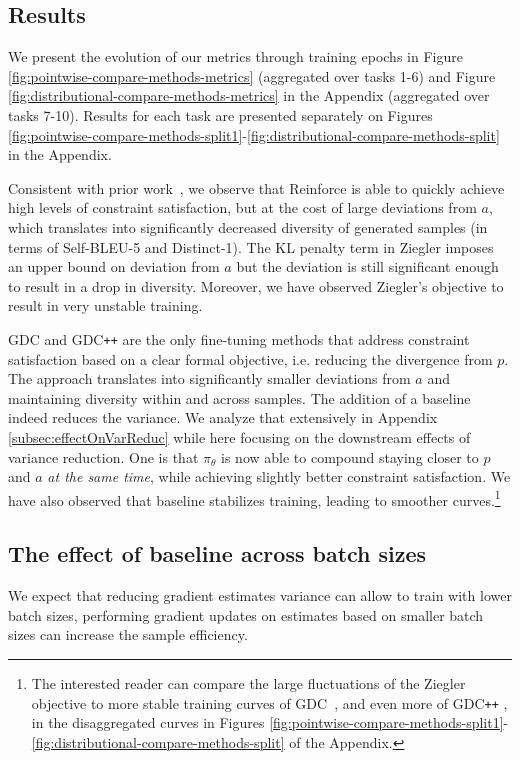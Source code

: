 \subsection{Results}
\label{subsec:general_results}
We present the evolution of our metrics through training epochs in Figure \ref{fig:pointwise-compare-methods-metrics} (aggregated over tasks 1-6) and Figure \ref{fig:distributional-compare-methods-metrics} in the Appendix (aggregated over tasks 7-10). Results for each task are presented separately on Figures \ref{fig:pointwise-compare-methods-split1}-\ref{fig:distributional-compare-methods-split} in the Appendix.

Consistent with prior work~\citep{khalifa_2021,pmlr-v162-korbak22a}, we observe that Reinforce is able to quickly achieve high levels of constraint satisfaction, but at the cost of large deviations from $a$, which translates into significantly decreased diversity of generated samples (in terms of Self-BLEU-5 and Distinct-1). The KL penalty term in Ziegler imposes an upper bound on deviation from $a$ but the deviation is still significant enough to result in a drop in diversity. Moreover, we have observed Ziegler's objective to result in very unstable training. 

GDC  and GDC\texttt{++}  are the only fine-tuning methods that address constraint satisfaction based on a clear formal objective, i.e. reducing the divergence from $p$. The approach translates into significantly smaller deviations from $a$ and maintaining diversity within and across samples. The addition of a baseline indeed reduces the variance. We analyze that extensively in Appendix \ref{subsec:effectOnVarReduc} while here focusing on the downstream effects of variance reduction. One is that ${\pi_\theta}$ is now able to compound staying closer to $p$ and $a$ \emph{at the same time}, while achieving slightly better constraint satisfaction. We have also observed that baseline stabilizes training, leading to smoother curves.\footnote{The interested reader can compare the large fluctuations of the Ziegler objective to more stable training curves of \hbox{GDC ,} and even more of GDC\texttt{++} , in the disaggregated curves in Figures \ref{fig:pointwise-compare-methods-split1}-\ref{fig:distributional-compare-methods-split} of the Appendix.} 

\subsection{The effect of baseline across batch sizes}
\label{subsec:bsz_exps}
We expect that reducing gradient estimates variance can allow to train with lower batch sizes, performing gradient updates on estimates based on smaller batch sizes can increase the sample efficiency. 

